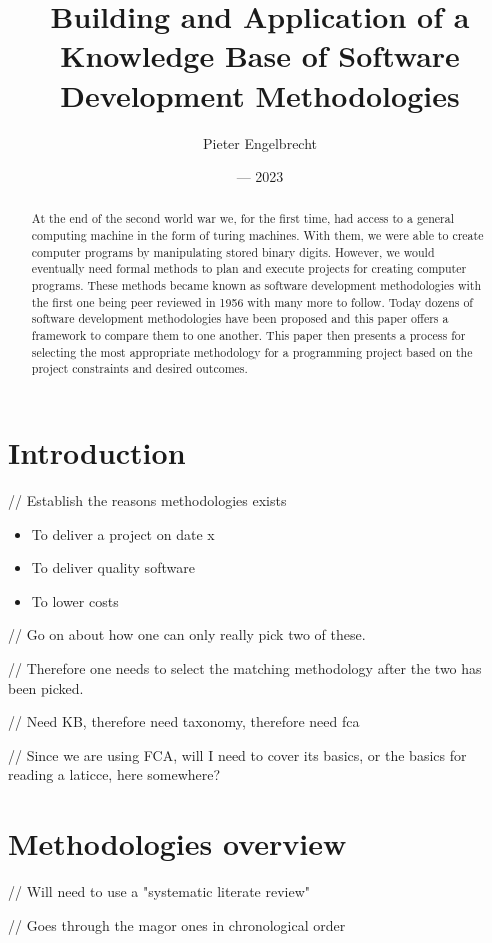 \documentclass{article}
\title{Building and Application of a Knowledge Base of Software Development Methodologies}
\author{Pieter Engelbrecht}
\date{--- 2023}
\begin{document}
\maketitle

\begin{abstract}
  At the end of the second world war we, for the first time, had access to a general computing machine in the form of turing machines.
  With them, we were able to create computer programs by manipulating stored binary digits.
  However, we would eventually need formal methods to plan and execute projects for creating computer programs.
  These methods became known as software development methodologies with the first one being peer reviewed in 1956 with many more to follow.
  Today dozens of software development methodologies have been proposed and this paper offers a framework to compare them to one another.
  This paper then presents a process for selecting the most appropriate methodology for a programming project based on the project constraints and desired outcomes.
\end{abstract}

\section{Introduction}
// Establish the reasons methodologies exists
\cite{einstein}

\begin{itemize}
    \item To deliver a project on date x
    \item To deliver quality software
    \item To lower costs
\end{itemize}

// Go on about how one can only really pick two of these.

// Therefore one needs to select the matching methodology after the two has been picked.

// Need KB, therefore need taxonomy, therefore need fca

// Since we are using FCA, will I need to cover its basics, or the basics for reading a laticce, here somewhere?

\section{Methodologies overview}
// Will need to use a "systematic literate review"

// Goes through the magor ones in chronological order
\end{document}
